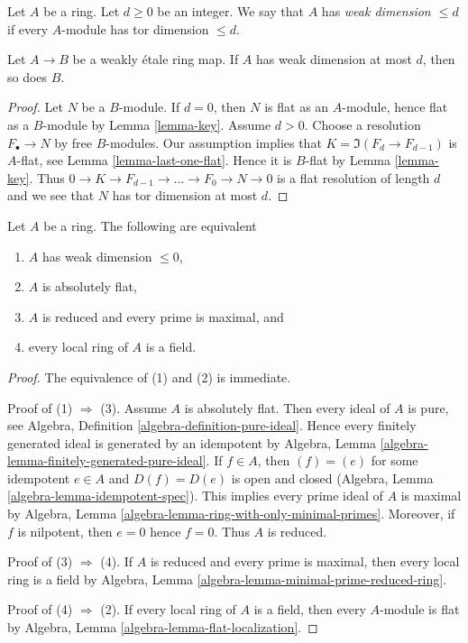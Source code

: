 \begin{definition}
\label{definition-weak-dimension}
Let $A$ be a ring. Let $d \geq 0$ be an integer.
We say that $A$ has {\it weak dimension $\leq d$}
if every $A$-module has tor dimension $\leq d$.
\end{definition}

\begin{lemma}
\label{lemma-weak-dimension-goes-up}
Let $A \to B$ be a weakly \'etale ring map.
If $A$ has weak dimension at most $d$, then so does $B$.
\end{lemma}

\begin{proof}
Let $N$ be a $B$-module. If $d = 0$, then $N$ is flat as an $A$-module,
hence flat as a $B$-module by Lemma \ref{lemma-key}.
Assume $d > 0$. Choose a resolution $F_\bullet \to N$
by free $B$-modules. Our assumption implies that
$K = \Im(F_d \to F_{d - 1})$ is $A$-flat, see
Lemma \ref{lemma-last-one-flat}. Hence it is $B$-flat
by Lemma \ref{lemma-key}. Thus
$0 \to K \to F_{d - 1} \to \ldots \to F_0 \to N \to 0$
is a flat resolution of length $d$ and we see that $N$ has
tor dimension at most $d$.
\end{proof}

\begin{lemma}
\label{lemma-absolutely-flat}
Let $A$ be a ring. The following are equivalent
\begin{enumerate}
\item $A$ has weak dimension $\leq 0$,
\item $A$ is absolutely flat,
\item $A$ is reduced and every prime is maximal, and
\item every local ring of $A$ is a field.
\end{enumerate}
\end{lemma}

\begin{proof}
The equivalence of (1) and (2) is immediate.

\medskip\noindent
Proof of (1) $\Rightarrow$ (3).
Assume $A$ is absolutely flat. Then every ideal of $A$ is pure, see
Algebra, Definition \ref{algebra-definition-pure-ideal}.
Hence every finitely generated ideal is generated by an idempotent by
Algebra, Lemma \ref{algebra-lemma-finitely-generated-pure-ideal}.
If $f \in A$, then $(f) = (e)$ for some idempotent $e \in A$
and $D(f) = D(e)$ is open and closed
(Algebra, Lemma \ref{algebra-lemma-idempotent-spec}).
This implies every prime ideal of $A$ is maximal by
Algebra, Lemma \ref{algebra-lemma-ring-with-only-minimal-primes}.
Moreover, if $f$ is nilpotent, then $e = 0$ hence $f = 0$.
Thus $A$ is reduced.

\medskip\noindent
Proof of (3) $\Rightarrow$ (4). If $A$ is reduced and every prime is
maximal, then every local ring is a field by
Algebra, Lemma \ref{algebra-lemma-minimal-prime-reduced-ring}.

\medskip\noindent
Proof of (4) $\Rightarrow$ (2). If every local ring of $A$ is a field,
then every $A$-module is flat by
Algebra, Lemma \ref{algebra-lemma-flat-localization}.
\end{proof}

